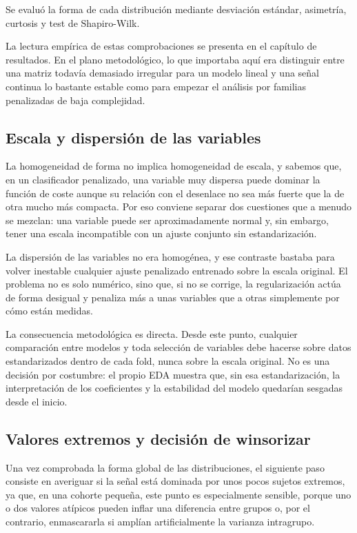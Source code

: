 Se evaluó la forma de cada distribución mediante desviación estándar, asimetría, curtosis y test de Shapiro-Wilk.

La lectura empírica de estas comprobaciones se presenta en el capítulo de resultados. En el plano metodológico, lo que
importaba aquí era distinguir entre una matriz todavía demasiado irregular para un modelo lineal y una señal continua lo
bastante estable como para empezar el análisis por familias penalizadas de baja complejidad.

\subsection{Escala y dispersión de las variables}

La homogeneidad de forma no implica homogeneidad de escala, y sabemos que, en un clasificador penalizado, una variable
muy dispersa puede dominar la función de coste aunque su relación con el desenlace no sea más fuerte que la de otra
mucho más compacta. Por eso conviene separar dos cuestiones que a menudo se mezclan: una variable puede ser
aproximadamente normal y, sin embargo, tener una escala incompatible con un ajuste conjunto sin estandarización.

La dispersión de las variables no era homogénea, y ese contraste bastaba para volver inestable cualquier ajuste
penalizado entrenado sobre la escala original. El problema no es solo numérico, sino que, si no se corrige, la
regularización actúa de forma desigual y penaliza más a unas variables que a otras simplemente por cómo están medidas.

La consecuencia metodológica es directa. Desde este punto, cualquier comparación entre modelos y toda selección de
variables debe hacerse sobre datos estandarizados dentro de cada fold, nunca sobre la escala original. No es una
decisión por costumbre: el propio EDA muestra que, sin esa estandarización, la interpretación de los coeficientes y la
estabilidad del modelo quedarían sesgadas desde el inicio.

\subsection{Valores extremos y decisión de winsorizar}

Una vez comprobada la forma global de las distribuciones, el siguiente paso consiste en averiguar si la señal está
dominada por unos pocos sujetos extremos, ya que, en una cohorte pequeña, este punto es especialmente sensible, porque
uno o dos valores atípicos pueden inflar una diferencia entre grupos o, por el contrario, enmascararla si amplían
artificialmente la varianza intragrupo.

